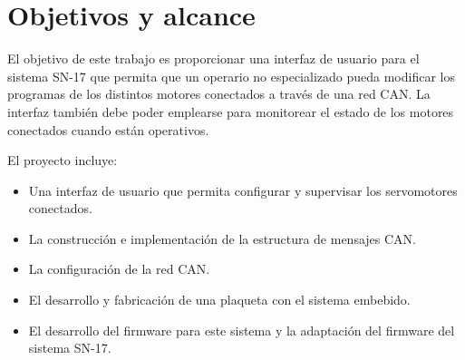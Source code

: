 \section{Objetivos y alcance}

El objetivo de este trabajo es proporcionar una interfaz de usuario para el sistema SN-17 que permita que un operario no especializado pueda modificar los programas de los distintos motores conectados a través de una red CAN. La interfaz también debe poder emplearse para monitorear el estado de los motores conectados cuando están operativos. 

El proyecto incluye:

\begin{itemize}
	\item Una interfaz de usuario que permita configurar y supervisar los servomotores conectados.
	\item La construcción e implementación de la estructura de mensajes CAN.
	\item La configuración de la red CAN.
	\item El desarrollo y fabricación de una plaqueta con el sistema embebido.
	\item El desarrollo del firmware para este sistema y la adaptación del firmware del sistema SN-17.
\end{itemize}


